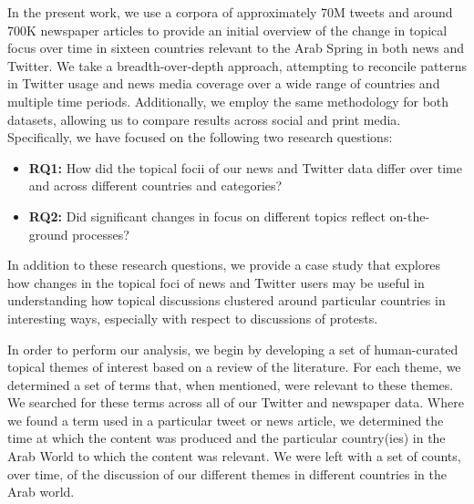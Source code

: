 In the present work, we use a corpora of approximately 70M tweets and around 700K newspaper articles to provide an initial overview of the change in topical focus over time in sixteen countries relevant to the Arab Spring in both news and Twitter.  We take a breadth-over-depth approach, attempting to reconcile patterns in Twitter usage and news media coverage over a wide range of countries and multiple time periods. Additionally, we employ the same methodology for both datasets, allowing us to compare results across social and print media.  Specifically, we have focused on the following two research questions:
\begin{itemize}
	\item {\bf RQ1:} How did the topical focii of our news and Twitter data differ over time and across different countries and categories?
	\item {\bf RQ2:} Did significant changes in focus on different topics reflect on-the-ground processes?
\end{itemize}
In addition to these research questions, we provide a case study that explores how changes in the topical foci of news and Twitter users may be useful in understanding how topical discussions clustered around particular countries in interesting ways, especially with respect to discussions of protests.

In order to perform our analysis, we begin by developing a set of human-curated topical themes of interest based on a review of the literature. For each theme, we determined a set of terms that, when mentioned, were relevant to these themes. We searched for these terms across all of our Twitter and newspaper data. Where we found a term used in a particular tweet or news article, we determined the time at which the content was produced and the particular country(ies) in the Arab World to which the content was relevant. We were left with a set of counts, over time, of the discussion of our different themes in different countries in the Arab world.

